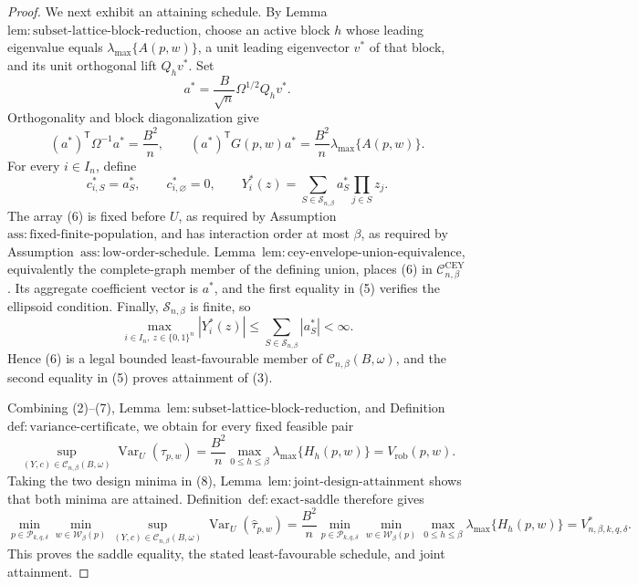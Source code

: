 \documentclass{article}
\begin{document}
\begin{proof}
We next exhibit an attaining schedule.  By Lemma~\(\mathrm{lem{:}subset\text{-}lattice\text{-}block\text{-}reduction}\), choose an active block \(h\) whose leading eigenvalue equals \(\lambda_{\max}\{A(p,w)\}\), a unit leading eigenvector \(v^*\) of that block, and its unit orthogonal lift \(Q_hv^*\).  Set
\[
a^*=\frac{B}{\sqrt n}\Omega^{1/2}Q_hv^*.
\tag{4}
\]
Orthogonality and block diagonalization give
\[
(a^*)^{\mathsf T}\Omega^{-1}a^*=\frac{B^2}{n},
\qquad
(a^*)^{\mathsf T}G(p,w)a^*
=\frac{B^2}{n}\lambda_{\max}\{A(p,w)\}.
\tag{5}
\]
For every \(i\in I_n\), define
\[
c^*_{i,S}=a^*_S,
\qquad c^*_{i,\varnothing}=0,
\qquad
Y_i^*(z)=\sum_{S\in\mathcal S_{n,\beta}}a^*_S\prod_{j\in S}z_j.
\tag{6}
\]
The array (6) is fixed before \(U\), as required by Assumption~\(\mathrm{ass{:}fixed\text{-}finite\text{-}population}\), and has interaction order at most \(\beta\), as required by Assumption~\(\mathrm{ass{:}low\text{-}order\text{-}schedule}\).  Lemma~\(\mathrm{lem{:}cey\text{-}envelope\text{-}union\text{-}equivalence}\), equivalently the complete-graph member of the defining union, places (6) in \(\mathcal C^{\mathrm{CEY}}_{n,\beta}\).  Its aggregate coefficient vector is \(a^*\), and the first equality in (5) verifies the ellipsoid condition.  Finally, \(\mathcal S_{n,\beta}\) is finite, so
\[
\max_{i\in I_n,\ z\in\{0,1\}^n}|Y_i^*(z)|
\le \sum_{S\in\mathcal S_{n,\beta}}|a_S^*|<\infty.
\tag{7}
\]
Hence (6) is a legal bounded least-favourable member of \(\mathcal C_{n,\beta}(B,\omega)\), and the second equality in (5) proves attainment of (3).

Combining (2)--(7), Lemma~\(\mathrm{lem{:}subset\text{-}lattice\text{-}block\text{-}reduction}\), and Definition~\(\mathrm{def{:}variance\text{-}certificate}\), we obtain for every fixed feasible pair
\[
\sup_{(Y,c)\in\mathcal C_{n,\beta}(B,\omega)}
\operatorname{Var}_U(\widehat\tau_{p,w})
=\frac{B^2}{n}\max_{0\le h\le\beta}
\lambda_{\max}\{H_h(p,w)\}
=V_{\mathrm{rob}}(p,w).
\tag{8}
\]
Taking the two design minima in (8), Lemma~\(\mathrm{lem{:}joint\text{-}design\text{-}attainment}\) shows that both minima are attained.  Definition~\(\mathrm{def{:}exact\text{-}saddle}\) therefore gives
\[
\min_{p\in\mathcal P_{k,q,\delta}}
\min_{w\in\mathcal W_\beta(p)}
\sup_{(Y,c)\in\mathcal C_{n,\beta}(B,\omega)}
\operatorname{Var}_U(\widehat\tau_{p,w})
=\frac{B^2}{n}
\min_{p\in\mathcal P_{k,q,\delta}}
\min_{w\in\mathcal W_\beta(p)}
\max_{0\le h\le\beta}\lambda_{\max}\{H_h(p,w)\}
=V^*_{n,\beta,k,q,\delta}.
\tag{9}
\]
This proves the saddle equality, the stated least-favourable schedule, and joint attainment.


\end{proof}
\end{document}
